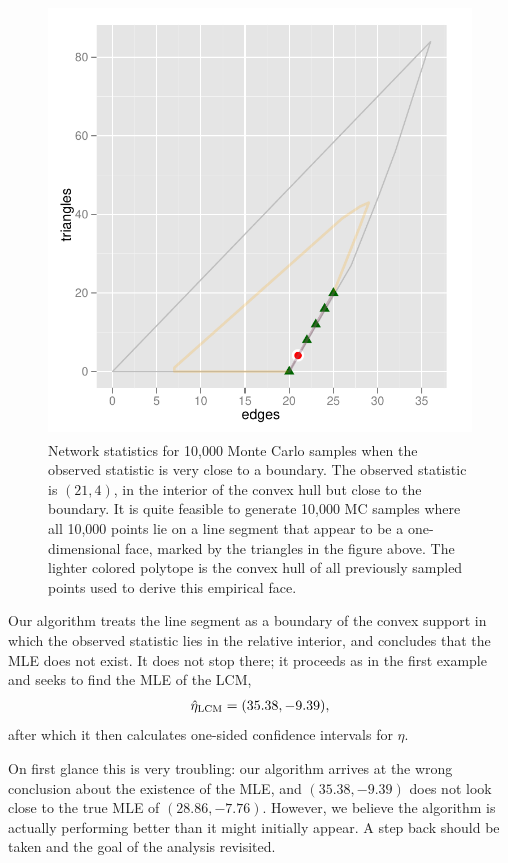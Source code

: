 \begin{figure}[h!]
\centering
\includegraphics[height=4.5in,width=4.5in]{Figures/MCsample-fakeface}
\caption[Network statistics for 10,000 Monte Carlo samples when the observed 
statistic is very close to a boundary]
{Network statistics for 10,000 Monte Carlo samples when the observed 
statistic is very close to a boundary.  The observed statistic is $(21,4)$, 
in the interior of the convex hull but 
close to the boundary.  It is quite feasible to generate 10,000 MC 
samples where all 10,000 points lie on a line segment that appear to be 
a one-dimensional face, marked by the triangles in the figure above.  
The lighter colored polytope is the convex hull of all previously 
sampled points used to derive this empirical face.}
\label{F:MC problem}
\end{figure}

Our algorithm treats the line segment as a boundary of the 
convex support in which the observed statistic lies in the relative interior, and 
concludes that the MLE does not exist.  It does not stop there; 
it proceeds as in the first
example and seeks to find the MLE of the LCM,
\begin{align*}
	\hat{\eta}_{\textrm{LCM}} = (35.38, -9.39),
\end{align*}
after which it then calculates one-sided confidence intervals for $\eta$.

On first glance this is very troubling: our algorithm arrives at the wrong conclusion 
about the existence of the MLE, and $(35.38, -9.39)$ does not look close 
to the true MLE of $(28.86, -7.76)$.  However, we believe the algorithm is
actually performing better than it might initially appear.
A step back should be taken and the goal of the analysis revisited.  

